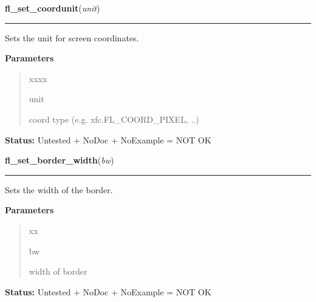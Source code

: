 \hspace{.8\funcindent}\begin{boxedminipage}{\funcwidth}

    \raggedright \textbf{fl\_set\_coordunit}(\textit{unit})

    \vspace{-1.5ex}

    \rule{\textwidth}{0.5\fboxrule}
\setlength{\parskip}{2ex}
    Sets the unit for screen coordinates.

\setlength{\parskip}{1ex}
      \textbf{Parameters}
      \vspace{-1ex}

      \begin{quote}
        \begin{Ventry}{xxxx}

          \item[unit]

          coord type (e.g. xfc.FL\_COORD\_PIXEL, ..)

        \end{Ventry}

      \end{quote}

\textbf{Status:} Untested + NoDoc + NoExample = NOT OK



    \end{boxedminipage}

    \label{xformslib:library:fl_set_border_width}

    \vspace{0.5ex}

\hspace{.8\funcindent}\begin{boxedminipage}{\funcwidth}

    \raggedright \textbf{fl\_set\_border\_width}(\textit{bw})

    \vspace{-1.5ex}

    \rule{\textwidth}{0.5\fboxrule}
\setlength{\parskip}{2ex}
    Sets the width of the border.

\setlength{\parskip}{1ex}
      \textbf{Parameters}
      \vspace{-1ex}

      \begin{quote}
        \begin{Ventry}{xx}

          \item[bw]

          width of border

        \end{Ventry}

      \end{quote}

\textbf{Status:} Untested + NoDoc + NoExample = NOT OK



    \end{boxedminipage}

